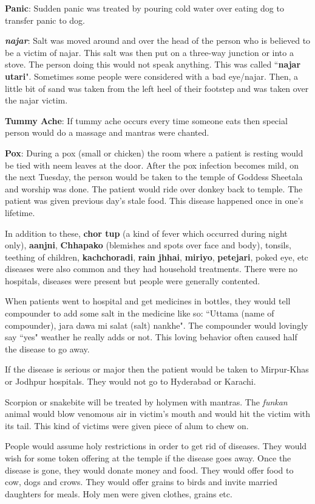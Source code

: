 \textbf{Panic}: Sudden panic was treated by pouring cold water over eating dog
to transfer panic to dog.

\textbf{\textit{najar}}: Salt was moved around and over the head of the person
who is believed to be a victim of najar. This salt was then put on a three-way
junction or into a stove. The person doing this would not speak anything. This
was called ``\textbf{najar utari}". Sometimes some people were considered with
a bad eye/najar. Then, a little bit of sand was taken from the left heel of
their footstep and was taken over the najar victim. 

\textbf{Tummy Ache}: If tummy ache occurs every time someone eats then special
person would do a massage and mantras were chanted.

\textbf{Pox}: During a pox (small or chicken) the room where a patient is
resting would be tied with neem leaves at the door. After the pox infection
becomes mild, on the next Tuesday, the person would be taken to the temple of
Goddess Sheetala and worship was done. The patient would ride over donkey back
to temple. The patient was given previous day's stale food. This disease
happened once in one's lifetime. 

In addition to these, \textbf{chor tup} (a kind of fever which occurred during
night only), \textbf{aanjni}, \textbf{Chhapako} (blemishes and spots over face
and body), tonsils, teething of children, \textbf{kachchoradi}, \textbf{rain
jhhai}, \textbf{miriyo}, \textbf{petejari}, poked eye, etc diseases were also
common and they had household treatments. There were no hospitals, diseases
were present but people were generally contented.

When patients went to hospital and get medicines in bottles, they would tell
compounder to add some salt in the medicine like so: ``Uttama (name of
compounder), jara dawa mi salat (salt) nankhe". The compounder would lovingly
say ``yes" weather he really adds or not. This loving behavior often caused
half the disease to go away.

If the disease is serious or major then the patient would be taken to
Mirpur-Khas or Jodhpur hospitals. They would not go to Hyderabad or Karachi.

Scorpion or snakebite will be treated by holymen with mantras. The
\textit{funkan} animal would blow venomous air in victim's mouth and would hit
the victim with its tail. This kind of victims were given piece of alum to chew
on. 

People would assume holy restrictions in order to get rid of diseases. They
would wish for some token offering at the temple if the disease goes away. Once
the disease is gone, they would donate money and food. They would offer food to
cow, dogs and crows. They would offer grains to birds and invite married
daughters for meals. Holy men were given clothes, grains etc.

